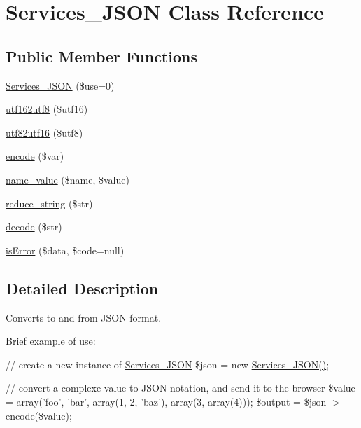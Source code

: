 \hypertarget{class_services___j_s_o_n}{\section{Services\-\_\-\-J\-S\-O\-N Class Reference}
\label{class_services___j_s_o_n}
}
\subsection*{Public Member Functions}
\begin{DoxyCompactItemize}
\item 
\hyperlink{class_services___j_s_o_n_aa5255d744e487a76bacdd07cd94999f5}{Services\-\_\-\-J\-S\-O\-N} (\$use=0)
\item 
\hyperlink{class_services___j_s_o_n_a7167ad98617ca8b7887f0c7b4f514e0f}{utf162utf8} (\$utf16)
\item 
\hyperlink{class_services___j_s_o_n_aabc494819af90a318b2433bb74401eb8}{utf82utf16} (\$utf8)
\item 
\hyperlink{class_services___j_s_o_n_a046fb8011100348910ee111045e16b0b}{encode} (\$var)
\item 
\hyperlink{class_services___j_s_o_n_a590b75f05db697ba37c5251e445de0d4}{name\-\_\-value} (\$name, \$value)
\item 
\hyperlink{class_services___j_s_o_n_a37b6a90c57f8909d50101f71f7872ab2}{reduce\-\_\-string} (\$str)
\item 
\hyperlink{class_services___j_s_o_n_ac00e714f96222d0048dfcd93e4d95ec2}{decode} (\$str)
\item 
\hyperlink{class_services___j_s_o_n_a2362480f2975e38784fd3f84042ddcb1}{is\-Error} (\$data, \$code=null)
\end{DoxyCompactItemize}


\subsection{Detailed Description}
Converts to and from J\-S\-O\-N format.

Brief example of use\-:

{\ttfamily  // create a new instance of \hyperlink{class_services___j_s_o_n}{Services\-\_\-\-J\-S\-O\-N} \$json = new \hyperlink{class_services___j_s_o_n_aa5255d744e487a76bacdd07cd94999f5}{Services\-\_\-\-J\-S\-O\-N()};}

{\ttfamily // convert a complexe value to J\-S\-O\-N notation, and send it to the browser \$value = array('foo', 'bar', array(1, 2, 'baz'), array(3, array(4))); \$output = \$json-\/$>$encode(\$value);}

